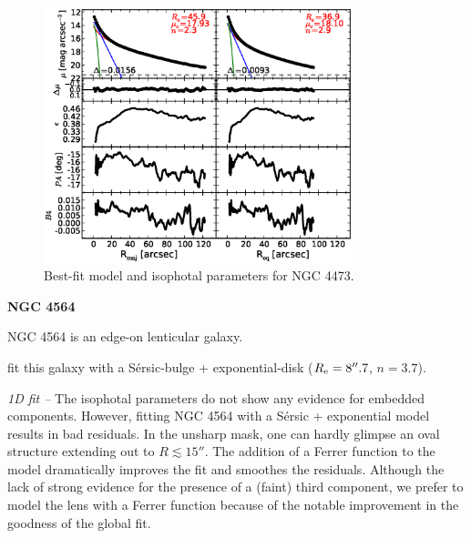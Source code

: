 \documentclass[preprint2]{emulateapj}
\newcommand{\fitfigurewidth}{0.8\textwidth}
\begin{document}
  \begin{figure}[h]
  \begin{center}
  \includegraphics[width=\fitfigurewidth]{images/n4473_1Dfit.eps}
  \caption{Best-fit model and isophotal parameters for NGC 4473.}
  \end{center}
  \end{figure}

  \clearpage\newpage\noindent
  {\bf NGC 4564 \\}

  NGC 4564 is an edge-on lenticular galaxy.

  \cite{fisherdrory2008} fit this galaxy with a S\'ersic-bulge + exponential-disk 
  ($R_{\rm e} = 8''.7$, $n = 3.7$). 

  \emph{1D fit -- }
  The isophotal parameters do not show any evidence for embedded components.
  However, fitting NGC 4564 with a S\'ersic + exponential model results in bad residuals.
  In the unsharp mask, one can hardly glimpse an oval structure extending out to $R \lesssim 15''$.
  The addition of a Ferrer function to the model dramatically improves the fit and smoothes the residuals.
  Although the lack of strong evidence for the presence of a (faint) third component, 
  we prefer to model the lens with a Ferrer function 
  because of the notable improvement in the goodness of the global fit.
\end{document}
